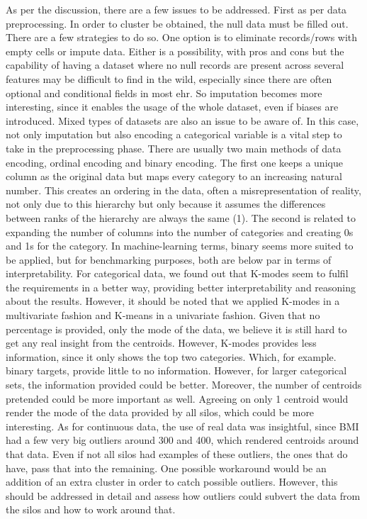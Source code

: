 As per the discussion, there are a few issues to be addressed. First as per data preprocessing. In order to cluster be obtained, the null data must be filled out. There are a few strategies to do so. One option is to eliminate records/rows with empty cells or impute data. Either is a possibility, with pros and cons but the capability of having a dataset where no null records are present across several features may be difficult to find in the wild, especially since there are often optional and conditional fields in most \ac{ehr}. So imputation becomes more interesting, since it enables the usage of the whole dataset, even if biases are introduced.
Mixed types of datasets are also an issue to be aware of. In this case, not only imputation but also encoding a categorical variable is a vital step to take in the preprocessing phase. There are usually two main methods of data encoding, ordinal encoding and binary encoding. The first one keeps a unique column as the original data but maps every category to an increasing natural number. This creates an ordering in the data, often a misrepresentation of reality, not only due to this hierarchy but only because it assumes the differences between ranks of the hierarchy are always the same (1). The second is related to expanding the number of columns into the number of categories and creating 0s and 1s for the category. In machine-learning terms, binary seems more suited to be applied, but for benchmarking purposes, both are below par in terms of interpretability. For categorical data, we found out that K-modes seem to fulfil the requirements in a better way, providing better interpretability and reasoning about the results. However, it should be noted that we applied K-modes in a multivariate fashion and K-means in a univariate fashion.
Given that no percentage is provided, only the mode of the data, we believe it is still hard to get any real insight from the centroids. However, K-modes provides less information, since it only shows the top two categories. Which, for example. binary targets, provide little to no information. However, for larger categorical sets, the information provided could be better. Moreover, the number of centroids pretended could be more important as well. Agreeing on only 1 centroid would render the mode of the data provided by all silos, which could be more interesting.
As for continuous data, the use of real data was insightful, since BMI had a few very big outliers around 300 and 400, which rendered centroids around that data. Even if not all silos had examples of these outliers, the ones that do have, pass that into the remaining. One possible workaround would be an addition of an extra cluster in order to catch possible outliers.
However, this should be addressed in detail and assess how outliers could subvert the data from the silos and how to work around that.

